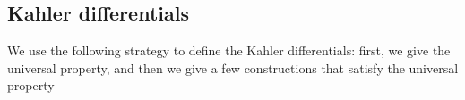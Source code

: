 %
%			
%
%

\subsection{Kahler differentials}


\newcommand{\Der}{\operatorname{Der}}

We use the following strategy to define
the Kahler differentials:
first, we give the universal property, 
and then we give a few constructions that
satisfy the universal property

